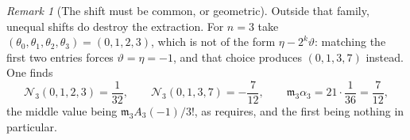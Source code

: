 \documentclass[11pt,a4paper,oneside,openany]{book}
\theoremstyle{definition}
\theoremstyle{remark}
\newtheorem{remark}[remark]{Remark}
\begin{document}
\begin{remark}[The shift must be common, or geometric]
Outside that family, unequal shifts do destroy the extraction.  For $n=3$ take
$(\theta_0,\theta_1,\theta_2,\theta_3)=(0,1,2,3)$, which is not of the form
$\eta-2^k\vartheta$: matching the first two entries forces
$\vartheta=\eta=-1$, and that choice produces $(0,1,3,7)$ instead.  One finds
\[
 \mathcal N_3(0,1,2,3)=\frac1{32},
 \qquad
 \mathcal N_3(0,1,3,7)=-\frac7{12},
 \qquad
 \mathfrak m_3\alpha_3=21\cdot\frac1{36}=\frac7{12},
\]
the middle value being $\mathfrak m_3A_3(-1)/3!$, as
 requires, and the first being nothing in
particular.
\end{remark}
\end{document}
